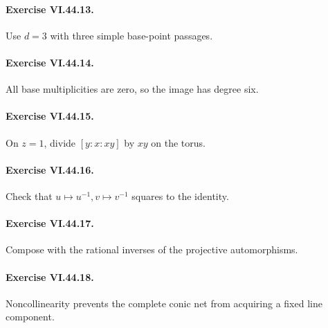 \paragraph{Exercise VI.44.13.}
\begin{hint}
Use \(d=3\) with three simple base-point passages.
\end{hint}

\paragraph{Exercise VI.44.14.}
\begin{hint}
All base multiplicities are zero, so the image has degree six.
\end{hint}

\paragraph{Exercise VI.44.15.}
\begin{hint}
On \(z=1\), divide \([y:x:xy]\) by \(xy\) on the torus.
\end{hint}

\paragraph{Exercise VI.44.16.}
\begin{hint}
Check that \(u\mapsto u^{-1},v\mapsto v^{-1}\) squares to the identity.
\end{hint}

\paragraph{Exercise VI.44.17.}
\begin{hint}
Compose with the rational inverses of the projective automorphisms.
\end{hint}

\paragraph{Exercise VI.44.18.}
\begin{hint}
Noncollinearity prevents the complete conic net from acquiring a fixed line component.
\end{hint}

